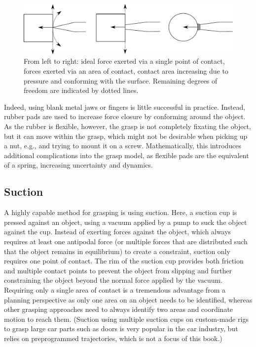 \begin{figure}
\includegraphics[width=\columnwidth]{figs/graspingcontacts}
\caption{From left to right: ideal force exerted via a single point of contact, forces exerted via an area of contact, contact area increasing due to pressure and conforming with the surface. Remaining degrees of freedom are indicated by dotted lines.\label{fig:contactarea}}
\end{figure}

Indeed, using blank metal jaws or fingers is little successful in practice. Instead, rubber pads are used to increase force closure by conforming around the object. As the rubber is flexible, however, the grasp is not completely fixating the object, but it can move within the grasp, which might not be desirable when picking up a nut, e.g., and trying to mount it on a screw. Mathematically, this introduces additional complications into the grasp model, as flexible pads are the equivalent of a spring, increasing uncertainty and dynamics. 

\subsection{Suction}

A highly capable method for grasping is using suction. Here, a suction cup is pressed against an object, using a vacuum applied by a pump to suck the object against the cup. Instead of exerting forces against the object, which always requires at least one antipodal force (or multiple forces that are distributed such that the object remains in equilibrium) to create a constraint, suction only requires one point of contact. The rim of the suction cup provides both friction and multiple contact points to prevent the object from slipping and further constraining the object beyond the normal force applied by the vacuum. Requiring only a single area of contact
is a tremendous advantage from a planning perspective as only one area on an object needs to be identified, whereas other grasping approaches need to always identify two areas and coordinate motion to reach them. (Suction using multiple suction cups on custom-made rigs to grasp large car parts such as doors is very popular in the car industry, but relies on preprogrammed trajectories, which is not a focus of this book.)


